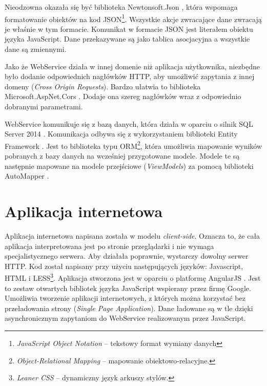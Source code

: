 \documentclass{book}
\begin{document}
		Nieodzowna okazała się być biblioteka Newtonsoft.Json \cite{id:NewtonsoftJSON}, która wspomaga formatowanie obiektów na kod JSON\footnote{\emph{JavaScript Object Notation} -- tekstowy format wymiany danych}. Wszystkie akcje zwracające dane zwracają je właśnie w tym formacie. Komunikat w formacie JSON jest literałem obiektu języka JavaScript. Dane przekazywane są jako tablica asocjacyjna a wszystkie dane są zmiennymi.
		
		Jako że WebService działa w innej domenie niż aplikacja użytkownika, niezbędne było dodanie odpowiednich nagłówków HTTP, aby umożliwić zapytania z innej domeny (\emph{Cross Origin Requests}). Bardzo ułatwia to biblioteka Microsoft.AspNet.Cors \cite{id:ASPCors}. Dodaje ona szereg nagłówków wraz z odpowiednio dobranymi parametrami.
		
		WebService komunikuje się z bazą danych, która działa w oparciu o silnik SQL Server 2014 \cite{id:SQLServer}. Komunikacja odbywa się z wykorzystaniem biblioteki Entity Framework \cite{id:EntityFramework}. Jest to biblioteka typu ORM\footnote{\emph{Object-Relational Mapping} -- mapowanie obiektowo-relacyjne. },
		która umożliwia mapowanie wyników pobranych z bazy danych na wcześniej przygotowane modele. Modele te są następnie mapowane na modele przejściowe (\emph{ViewModels}) za pomocą biblioteki AutoMapper \cite{id:Automapper}.
		
		\section{Aplikacja internetowa} 
			
		Aplikacja internetowa napisana została w modelu \emph{client-side}. Oznacza to, że cała aplikacja interpretowana jest po stronie przeglądarki i nie wymaga specjalistycznego serwera. Aby działała poprawnie, wystarczy dowolny serwer HTTP. Kod został napisany przy użyciu następujących języków: Javascript, HTML i LESS\footnote{\emph{Leaner CSS} -- dynamiczny język arkuszy stylów.}. 
		Aplikacja stworzona jest w oparciu o platformę AngularJS \cite{keylist}. Jest to zestaw otwartych bibliotek języka JavaScript wspierany przez firmę Google. Umożliwia tworzenie aplikacji internetowych, z których można korzystać bez przeładowania strony (\emph{Single Page Application}). Dane ładowane są w tle dzięki asynchronicznym zapytaniom do WebService realizowanym przez JavaScript.
		
\end{document}
